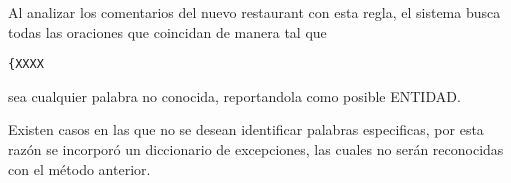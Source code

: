 Al analizar los comentarios del nuevo restaurant con esta regla, el sistema busca todas las oraciones que coincidan de manera tal que \begin{verbatim}{XXXX\end{verbatim} sea cualquier palabra no conocida, reportandola como posible ENTIDAD.

Existen casos en las que no se desean identificar palabras especificas, por esta razón se incorporó un diccionario de excepciones, las cuales no serán reconocidas con el método anterior.

